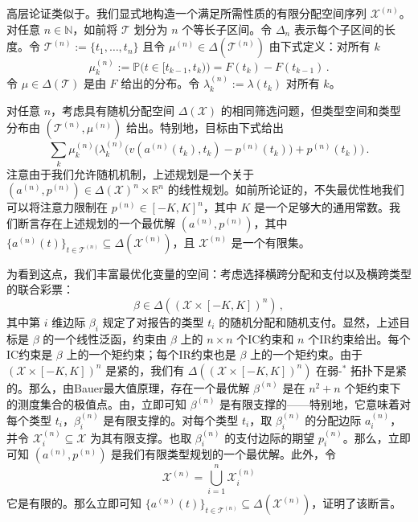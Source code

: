 \documentclass[12pt,letterpaper]{article}
\newenvironment{translation}{\color{blue}\noindent}{}
\theoremstyle{plain}
\theoremstyle{definition}
\theoremstyle{remark}
\renewcommand{\P}{\mathds{P}}
\newcommand{\R}{\mathds{R}}
\newcommand{\N}{\mathds{N}}
\renewcommand{\1}{\mathds{1}}
\newcommand{\X}{\mathcal{X}}
\theoremstyle{definition}
\begin{document}
\begin{translation}
高层论证类似于。我们显式地构造一个满足所需性质的有限分配空间序列 $\X^{(n)}$。对任意 $n \in \N$，如前将 $\mathcal{T}$ 划分为 $n$ 个等长子区间。令 $\Delta_n$ 表示每个子区间的长度。令 $\mathcal{T}^{(n)} := \{t_1,\dots,t_n\}$ 且令 $\mu^{(n)} \in \Delta(\mathcal{T}^{(n)})$ 由下式定义：对所有 $k$
\[\mu^{(n)}_k := \P\big(t \in [t_{k-1}, t_{k}) \big)=F(t_{k})-F(t_{k-1})\,.\]
令 $\mu \in \Delta(\mathcal{T})$ 是由 $F$ 给出的分布。令 $\lambda_k^{(n)}:=\lambda(t_k)$ 对所有 $k$。

对任意 $n$，考虑具有随机分配空间 $\Delta(\X)$ 的相同筛选问题，但类型空间和类型分布由 $(\mathcal{T}^{(n)}, \mu^{(n)})$ 给出。特别地，目标由下式给出
\[\sum_k \mu^{(n)}_k  \Big(\lambda^{(n)}_k\big(v(a^{(n)}(t_k),t_k) -p^{(n)}(t_k)\big) + p^{(n)}(t_k)\Big)\,. \]
注意由于我们允许随机机制，上述规划是一个关于 $(a^{(n)},  p^{(n)}) \in \Delta(\X)^n \times \R^n$ 的线性规划。如前所论证的，不失最优性地我们可以将注意力限制在 $p^{(n)} \in [-K, K]^{n}$，其中 $K$ 是一个足够大的通用常数。我们断言存在上述规划的一个最优解 $(a^{(n)}, p^{(n)})$，其中 $\{a^{(n)}(t)\}_{t \in \mathcal{T}^{(n)}} \subseteq \Delta(\X^{(n)})$，且 $\X^{(n)}$ 是一个有限集。

为看到这点，我们丰富最优化变量的空间：考虑选择横跨分配和支付以及横跨类型的联合彩票：
\[\beta \in \Delta((\X \times [-K, K])^{n})\,,\]
其中第 $i$ 维边际 $\beta_i$ 规定了对报告的类型 $t_i$ 的随机分配和随机支付。显然，上述目标是 $\beta$ 的一个线性泛函，约束由 $\beta$ 上的 $n \times n$ 个IC约束和 $n$ 个IR约束给出。每个IC约束是 $\beta$ 上的一个矩约束；每个IR约束也是 $\beta$ 上的一个矩约束。由于 $(\X \times [-K, K])^{n}$ 是紧的，我们有 $\Delta((\X \times [-K, K])^{n})$ 在弱-$^*$ 拓扑下是紧的。那么，由Bauer最大值原理，存在一个最优解 $\beta^{(n)}$ 是在 $n^2 + n$ 个矩约束下的测度集合的极值点。由\citet{Winkler1988}，立即可知 $\beta^{(n)}$ 是有限支撑的——特别地，它意味着对每个类型 $t_i$，$\beta^{(n)}_i$ 是有限支撑的。对每个类型 $t_i$，取 $\beta^{(n)}_i$ 的分配边际 $a^{(n)}_i$，并令 $\X^{(n)}_i \subseteq \X$ 为其有限支撑。也取 $\beta^{(n)}_i$ 的支付边际的期望 $p^{(n)}_i$。那么，立即可知 $(a^{(n)}, p^{(n)})$ 是我们有限类型规划的一个最优解。此外，令
\[\X^{(n)} = \bigcup_{i=1}^n \X^{(n)}_i\]
它是有限的。那么立即可知 $\{a^{(n)}(t)\}_{t \in \mathcal{T}^{(n)}} \subseteq \Delta(\X^{(n)})$，证明了该断言。
\end{translation}
\end{document}
